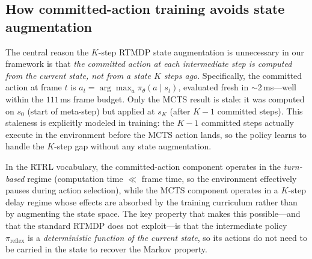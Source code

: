 \subsection*{How committed-action training avoids state augmentation}

The central reason the $K$-step RTMDP state augmentation is unnecessary in
our framework is that \emph{the committed action at each intermediate step is
computed from the current state, not from a state $K$ steps ago}.
Specifically, the committed action at frame $t$ is
$a_t = \arg\max_a \pi_\theta(a \mid s_t)$, evaluated fresh in $\sim$2\,ms---well
within the $111$\,ms frame budget.
Only the MCTS result is stale: it was computed on $s_0$ (start of meta-step)
but applied at $s_K$ (after $K{-}1$ committed steps).
This staleness is explicitly modeled in training: the $K{-}1$ committed steps
actually execute in the environment before the MCTS action lands, so the policy
learns to handle the $K$-step gap without any state augmentation.

In the RTRL vocabulary, the committed-action component operates in the
\emph{turn-based} regime (computation time $\ll$ frame time, so the environment
effectively pauses during action selection), while the MCTS component operates
in a $K$-step delay regime whose effects are absorbed by the training curriculum
rather than by augmenting the state space.
The key property that makes this possible---and that the standard RTMDP does not
exploit---is that the intermediate policy $\pi_{\mathrm{reflex}}$ is a
\emph{deterministic function of the current state}, so its actions do not need
to be carried in the state to recover the Markov property.


\newpage



